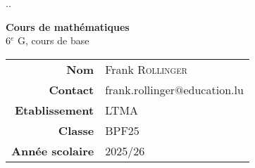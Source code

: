 \documentclass[a4paper, 11pt, oneside, BCOR=0mm, DIV=15]{scrbook} %
\def\classe{BPF25}
\def\season{2025/26}
\begin{document}
\thispagestyle{empty}
{\color{white}.\hfill.}
\vspace{5cm}

\begin{center}
\huge
{\bfseries Cours de mathématiques} \\
6$^e$ G, cours de base
\end{center}

\vfill

\large
\begin{center}
\begin{tabular}{r|l}
\textbf{Nom}
 & Frank {\scshape Rollinger} \\
\textbf{Contact}
 & {frank.rollinger$@$education.lu} \\
\textbf{Etablissement}
 & {\scshape LTMA} \\
\textbf{Classe}
 & {\scshape \classe} \\
\textbf{Année scolaire}
 & {\scshape \season}
\end{tabular}
\end{center}


\clearpage




%
%
%
%
%
\end{document}
